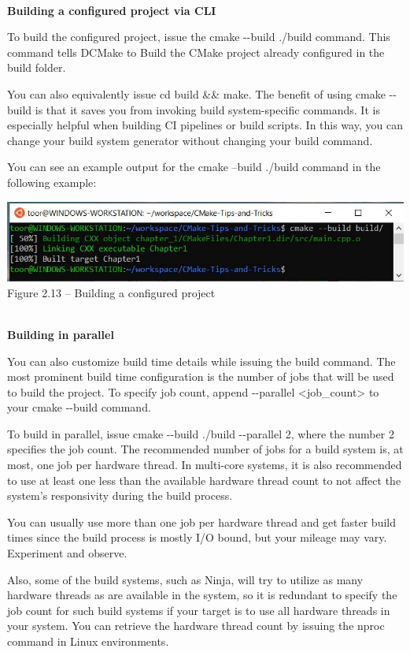 \hspace*{\fill} \\ %
\noindent
\textbf{Building a configured project via CLI}

To build the configured project, issue the cmake -{}-build ./build command. This command tells DCMake to Build the CMake project already configured in the build folder.

You can also equivalently issue cd build \&\& make. The benefit of using cmake -{}-build is that it saves you from invoking build system-specific commands. It is especially helpful when building CI pipelines or build scripts. In this way, you can change your build system generator without changing your build command.

You can see an example output for the cmake --build ./build command in the following example:

\begin{center}
\includegraphics[width=1.\textwidth]{content/1/chapter2/images/13.jpg}\\
Figure 2.13 – Building a configured project
\end{center}

\hspace*{\fill} \\ %
\noindent
\textbf{Building in parallel}

You can also customize build time details while issuing the build command. The most prominent build time configuration is the number of jobs that will be used to build the project. To specify job count, append -{}-parallel <job\_count> to your cmake -{}-build command.

To build in parallel, issue cmake -{}-build ./build -{}-parallel 2, where the number 2 specifies the job count. The recommended number of jobs for a build system is, at most, one job per hardware thread. In multi-core systems, it is also recommended to use at least one less than the available hardware thread count to not affect the system's responsivity during the build process.

\begin{tcolorbox}[colback=webgreen!5!white,colframe=webgreen!75!black,title=Note]
You can usually use more than one job per hardware thread and get faster build times since the build process is mostly I/O bound, but your mileage may vary. Experiment and observe.

Also, some of the build systems, such as Ninja, will try to utilize as many hardware threads as are available in the system, so it is redundant to specify the job count for such build systems if your target is to use all hardware threads in your system. You can retrieve the hardware thread count by issuing the nproc command in Linux environments.
\end{tcolorbox}

